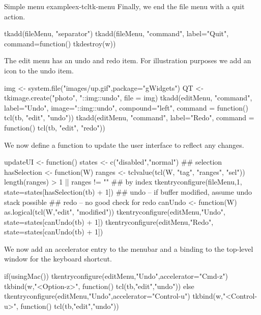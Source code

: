 \begin{example}{Simple menu example}{ex-tcltk-menu}
Finally, we end the file menu with a quit action. 
\begin{Schunk}
\begin{Sinput}
 tkadd(fileMenu, "separator")
 tkadd(fileMenu, "command", label="Quit", 
       command=function() tkdestroy(w))
\end{Sinput}
\end{Schunk}

The edit menu has an undo and redo item. For illustration purposes we add an icon to the undo item.
\begin{Schunk}
\begin{Sinput}
 img <- system.file("images/up.gif",package="gWidgets")
 QT <- tkimage.create("photo", "::img::undo", 
                      file = img)
 tkadd(editMenu, "command", label="Undo",
       image="::img::undo", compound="left",
       command = function() tcl(tb, "edit", "undo"))
 tkadd(editMenu, "command", label="Redo",
       command = function() tcl(tb, "edit", "redo"))
\end{Sinput}
\end{Schunk}

We now define a function to update the user interface to reflect any changes.
\begin{Schunk}
\begin{Sinput}
 updateUI <- function() {
   states <- c("disabled","normal")
   ## selection
   hasSelection <- function(W) {
     ranges <- tclvalue(tcl(W, "tag", "ranges", "sel"))
     length(ranges) > 1 || ranges != ""
   }
   ## by index  
   tkentryconfigure(fileMenu,1,  state=states[hasSelection(tb) + 1]) 
   ## undo -- if buffer modified, assume undo stack possible
   ## redo -- no good check for redo
   canUndo <- function(W) as.logical(tcl(W,"edit", "modified"))
   tkentryconfigure(editMenu,"Undo", state=states[canUndo(tb) + 1])
   tkentryconfigure(editMenu,"Redo", state=states[canUndo(tb) + 1])
 }
\end{Sinput}
\end{Schunk}

We now add an accelerator entry to the menubar and a binding to the top-level window for the keyboard shortcut.
\begin{Schunk}
\begin{Sinput}
 if(usingMac()) {
   tkentryconfigure(editMenu,"Undo",accelerator="Cmd-z")
   tkbind(w,"<Option-z>", function() tcl(tb,"edit","undo"))
 } else {
   tkentryconfigure(editMenu,"Undo",accelerator="Control-u")
   tkbind(w,"<Control-u>", function() tcl(tb,"edit","undo"))
 }
\end{Sinput}
\end{Schunk}


\end{example}

